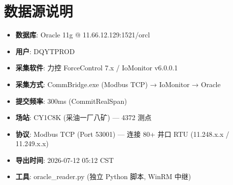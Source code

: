 \documentclass[12pt,a4paper]{ctexart}
\begin{document}
\section{数据源说明}

\begin{itemize}[leftmargin=*]
  \item \textbf{数据库}: Oracle 11g @ 11.66.12.129:1521/orcl
  \item \textbf{用户}: DQYTPROD
  \item \textbf{采集软件}: 力控 ForceControl 7.x / IoMonitor v6.0.0.1
  \item \textbf{采集方式}: CommBridge.exe (Modbus TCP) → IoMonitor → Oracle
  \item \textbf{提交频率}: 300ms (CommitRealSpan)
  \item \textbf{场站}: CY1C8K (采油一厂八矿) — 4372 测点
  \item \textbf{协议}: Modbus TCP (Port 53001) — 连接 80+ 井口 RTU (11.248.x.x / 11.249.x.x)
  \item \textbf{导出时间}: 2026-07-12 05:12 CST
  \item \textbf{工具}: oracle\_reader.py (独立 Python 脚本, WinRM 中继)
\end{itemize}
\end{document}
